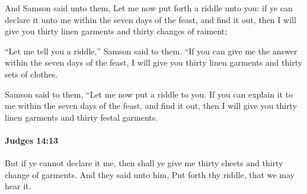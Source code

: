 			\begin{versebox}
					\item[BHS] 
					\item[ASV] And Samson said unto them, Let me now put forth a riddle unto you: if ye can declare it unto me within the seven days of the feast, and find it out, then I will give you thirty linen garments and thirty changes of raiment;
					\item[NIV] “Let me tell you a riddle,” Samson said to them. “If you can give me the answer within the seven days of the feast, I will give you thirty linen garments and thirty sets of clothes.
					\item[NRSV] Samson said to them, “Let me now put a riddle to you. If you can explain it to me within the seven days of the feast, and find it out, then I will give you thirty linen garments and thirty festal garments.
			\end{versebox}

		\paragraph{Judges 14:13} %
			\label{JUDGES-14-13}

			But if ye cannot declare it me, then shall ye give me thirty sheets and thirty change of garments. And they said unto him, Put forth thy riddle, that we may hear it.

